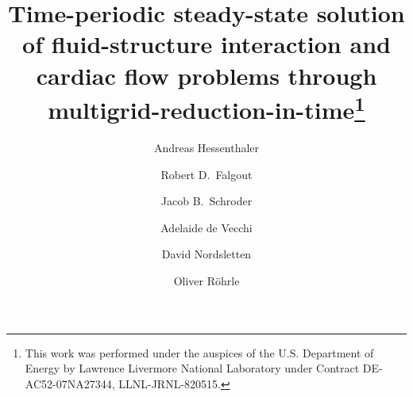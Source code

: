 \documentclass[3p]{elsarticle}
\begin{document}
\begin{frontmatter}

\title{Time-periodic steady-state solution of fluid-structure interaction and cardiac
flow problems through multigrid-reduction-in-time\footnote{This
work was performed under the auspices of the U.S. Department of Energy
by Lawrence Livermore National Laboratory under Contract DE-AC52-07NA27344,
LLNL-JRNL-820515.}}

\author[Stuttgart,SimTech]{Andreas Hessenthaler}

\author[LLNL]{Robert D.\ Falgout}

\author[UNM]{Jacob B.\ Schroder}

\author[KCL]{Adelaide de Vecchi}

\author[KCL,UM]{David Nordsletten}

\author[Stuttgart,SimTech]{Oliver R\"ohrle}

\address[Stuttgart]{Institute for Modelling and Simulation of Biomechanical Systems,
University of Stuttgart, Pfaffenwaldring 5a, 70569~Stuttgart, Germany}

\address[SimTech]{Stuttgart Center for Simulation Technology, University of Stuttgart,
Pfaffenwaldring 5a, 70569 Stuttgart, Germany}

\address[LLNL]{Center for Applied Scientific Computing, Lawrence Livermore National Laboratory, Livermore, CA 94551}

\address[UNM]{Department of Mathematics and Statistics, University of New Mexico, Albuquerque, NM 87131}

\address[KCL]{School of Biomedical Engineering and Imaging Sciences, King's College London, 4th FL Rayne Institute, St.~Thomas~Hospital, London, SE1 7EH}

\address[UM]{Department of Biomedical Engineering and Cardiac Surgery, University of Michigan, NCRC B20, 2800 Plymouth Rd, Ann~Arbor, 48109}



\end{frontmatter}
\end{document}
